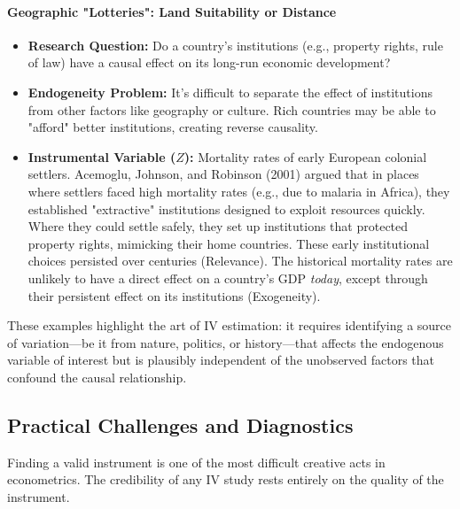 \documentclass{article}
\begin{document}
\paragraph{Geographic "Lotteries": Land Suitability or Distance}
\begin{itemize}
    \item \textbf{Research Question:} Do a country's institutions (e.g., property rights, rule of law) have a causal effect on its long-run economic development?
    \item \textbf{Endogeneity Problem:} It's difficult to separate the effect of institutions from other factors like geography or culture. Rich countries may be able to "afford" better institutions, creating reverse causality.
    \item \textbf{Instrumental Variable ($Z$):} Mortality rates of early European colonial settlers. Acemoglu, Johnson, and Robinson (2001) argued that in places where settlers faced high mortality rates (e.g., due to malaria in Africa), they established "extractive" institutions designed to exploit resources quickly. Where they could settle safely, they set up institutions that protected property rights, mimicking their home countries. These early institutional choices persisted over centuries (Relevance). The historical mortality rates are unlikely to have a direct effect on a country's GDP \textit{today}, except through their persistent effect on its institutions (Exogeneity).
\end{itemize}

These examples highlight the art of IV estimation: it requires identifying a source of variation—be it from nature, politics, or history—that affects the endogenous variable of interest but is plausibly independent of the unobserved factors that confound the causal relationship.

\subsection{Practical Challenges and Diagnostics}
\label{sub:iv_practice}

Finding a valid instrument is one of the most difficult creative acts in econometrics. The credibility of any IV study rests entirely on the quality of the instrument.
\end{document}
